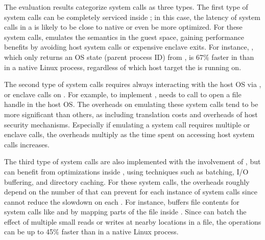 

The evaluation results categorize
system calls as three types.
The first type of system calls can be completely serviced inside \thelibos{};
in this case, the latency of system calls
in a \picoproc{}
is likely to be close to native
or even be more optimized.
For these system calls,
\thelibos{} emulates the semantics
in the guest space,
gaining performance benefits
by avoiding host system calls or expensive enclave exits.
For instance,
, which only returns an OS state
(parent process ID) from \thelibos{},
is 67\% faster in \graphene{} than in a native Linux process,
regardless of which host target
the \libos{} is running on.


The second type of system calls
requires
always interacting with the host OS via \thehostabi{},
or enclave calls on \sgx{}.
For example, to implement , \thelibos{} needs to call  to open a file handle in the host OS.
The overheads on emulating these system calls
tend to be more significant
than others, as including translation costs and overheads of host security mechanisms.
Especially if emulating a system call
requires multiple \hostapis{}
or enclave calls,
the overheads multiply as the time spent on accessing host system calls increases.



The third type of system calls are also implemented
with the involvement
of \hostapis{}, but can benefit from optimizations inside \libos{}, using techniques
such as \hostapi{} batching, I/O buffering,
and directory caching. 
For these system calls,
the overheads roughly depend on
the number of \hostapis{}
that \thelibos{} can prevent for each instance of system calls
since \thelibos{}
cannot reduce the slowdown on each \hostapi{}.
For instance,
\thelibos{} buffers file contents for system calls like  and 
by mapping parts of the file inside \picoprocs{}.
Since \thelibos{}
can batch the effect of multiple small reads or writes
at nearby locations in a file,
the operations
can be up to \roughly{}45\% faster than in a native Linux process.  


